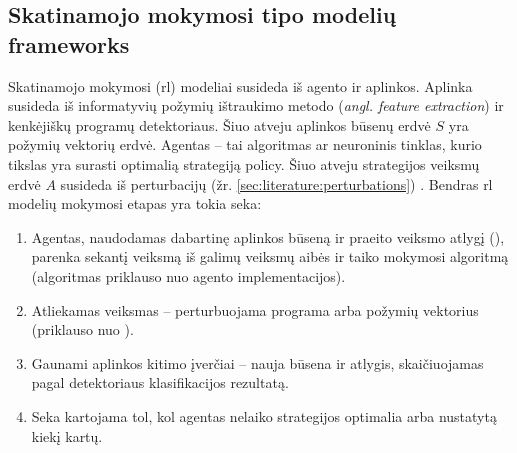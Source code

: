 \subsection{Skatinamojo mokymosi tipo modelių \glspl{framework}}\label{sec:literature:rl}

Skatinamojo mokymosi (\acs{rl}) modeliai susideda iš agento ir aplinkos.
Aplinka susideda iš informatyvių požymių ištraukimo metodo (\textit{angl.
    feature extraction}) ir kenkėjiškų programų detektoriaus. Šiuo atveju aplinkos
būsenų erdvė $S$ yra požymių vektorių erdvė. Agentas -- tai algoritmas ar
neuroninis tinklas, kurio tikslas yra surasti optimalią strategiją
\gls{policy}. Šiuo atveju strategijos veiksmų erdvė $A$ susideda iš
perturbacijų (žr. \ref{sec:literature:perturbations}) \cite{fangEvadingMalwareEngines2019}. Bendras
\ac{rl} modelių mokymosi etapas yra tokia seka:
\begin{enumerate}
    \item Agentas, naudodamas dabartinę aplinkos būseną ir praeito veiksmo atlygį
          (), parenka sekantį veiksmą iš galimų veiksmų aibės ir taiko
          mokymosi algoritmą (algoritmas priklauso nuo agento implementacijos).
    \item Atliekamas veiksmas -- perturbuojama programa arba požymių vektorius (priklauso
          nuo ).
    \item Gaunami aplinkos kitimo įverčiai -- nauja būsena ir atlygis, skaičiuojamas
          pagal detektoriaus klasifikacijos rezultatą.
    \item Seka kartojama tol, kol agentas nelaiko strategijos optimalia arba nustatytą
          kiekį kartų.
\end{enumerate}
\cite{fangEvadingMalwareEngines2019, zhongReinforcementLearningBased2022}

